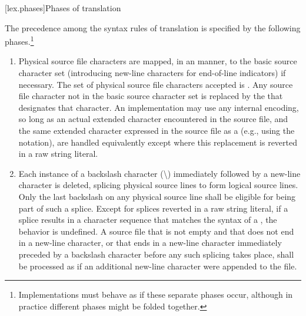 [lex.phases]{Phases of translation}%

\pnum
{}%
The precedence among the syntax rules of translation is specified by the
following phases.\footnote{Implementations must behave as if these separate phases
occur, although in practice different phases might be folded together.}

\begin{enumerate}
%
%
\item Physical source file characters are mapped, in an
 manner,
to the basic source character set (introducing new-line characters for end-of-line
indicators) if necessary.
The set of physical source file characters accepted is .
Any
source file character not in the basic source character
set is replaced by the
 that
designates that character. An implementation may use any internal
encoding, so long as an actual extended character encountered in the
source file, and the same extended character expressed in the source
file as a  (e.g., using the  notation), are handled equivalently
except where this replacement is reverted in a raw string literal.

%
\item Each instance of a backslash character (\textbackslash)
immediately followed by a new-line character is deleted, splicing
physical source lines to form logical source lines. Only the last
backslash on any physical source line shall be eligible for being part
of such a splice.
Except for splices reverted in a raw string literal, if a splice results in
a character sequence that matches the
syntax of a , the behavior is
undefined. A source file that is not empty and that does not end in a new-line
character, or that ends in a new-line character immediately preceded by a
backslash character before any such splicing takes place,
shall be processed as if an additional new-line character were appended
to the file.


\end{enumerate}
